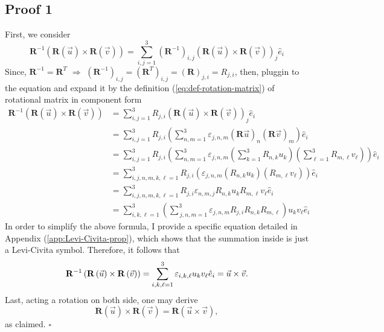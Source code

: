 \documentclass[12pt]{article}
\begin{document}
\subsection{Proof 1}
 First, we consider
\begin{equation}
\mathbf{R}^{-1}\left(\mathbf{R}\left(\vec{u}\right) \times \mathbf{R}\left(\vec{v}\right)\right)
= \sum_{i,j=1}^{3} (\mathbf{R}^{-1})_{i,j} \left(\mathbf{R}\left(\vec{u}\right) \times \mathbf{R}\left(\vec{v}\right)\right)_{j} \hat{e}_{i}
\end{equation}
Since, $\mathbf{R}^{-1} = \mathbf{R}^{T}$ $\Rightarrow$ $(\mathbf{R}^{-1})_{i,j} = (\mathbf{R}^{T})_{i,j} = (\mathbf{R})_{j,i} = R_{j,i}$, then, pluggin to the equation 
and expand it by the definition (\ref{eq:def-rotation-matrix}) of rotational matrix in component form
\begin{align}
\mathbf{R}^{-1}\left(\mathbf{R}\left(\vec{u}\right) \times \mathbf{R}\left(\vec{v}\right)\right)
&= \sum_{i,j=1}^{3} R_{j,i} \left(\mathbf{R}\left(\vec{u}\right) \times \mathbf{R}\left(\vec{v}\right)\right)_{j} \hat{e}_{i}\\
&= \sum_{i,j=1}^{3} R_{j,i} \left(
\sum_{n,m=1}^{3}\varepsilon_{j,n,m} \left(\mathbf{R}\vec{u}\right)_{n}\left(\mathbf{R}\vec{v}\right)_{m}
\right) \hat{e}_{i}\\
&= \sum_{i,j=1}^{3} R_{j,i} \left(
\sum_{n,m=1}^{3}\varepsilon_{j,n,m} \left(\sum_{k=1}^{3}R_{n,k}u_k\right)\left(\sum_{\ell=1}^{3}R_{m,\ell}v_{\ell}\right)
\right) \hat{e}_{i}\\
&= \sum_{i,j,n,m,k,\ell=1}^{3} R_{j,i} \left(
\varepsilon_{j,n,m} \left(R_{n,k}u_k\right)\left(R_{m,\ell}v_{\ell}\right)
\right) \hat{e}_{i}\\
&= \sum_{i,j,n,m,k,\ell=1}^{3} R_{j,i} \varepsilon_{n,m,j} R_{n,k} u_k R_{m,\ell} v_{\ell} \hat{e}_{i}\\
&= \sum_{i,k,\ell=1}^{3}  \left(\sum_{\,j,n,m=1}^{3}\varepsilon_{j,n,m} R_{j,i} R_{n,k} R_{m,\ell} \right) u_k v_{\ell} \hat{e}_{i}
\end{align}
In order to simplify the above formula, I provide a specific equation detailed in Appendix (\ref{app:Levi-Civita-prop}), which shows that the summation inside is just a Levi-Civita symbol. Therefore, it follows that
\begin{equation}
\mathbf{R}^{-1}\left(\mathbf{R}\left(\vec{u}\right) \times \mathbf{R}\left(\vec{v}\right)\right)
= \sum_{i,k,\ell=1}^{3}  \varepsilon_{i,k,\ell} u_k v_{\ell} \hat{e}_{i}\\
= \vec{u}\times\vec{v}.
\end{equation}
Last, acting a rotation on both side, one may derive 
\begin{equation}
\mathbf{R}\left(\vec{u}\right) \times \mathbf{R}\left(\vec{v}\right) = \mathbf{R}\left(\vec{u}\times\vec{v}\right),
\end{equation}
as claimed. $\square$
\newpage
\end{document}
